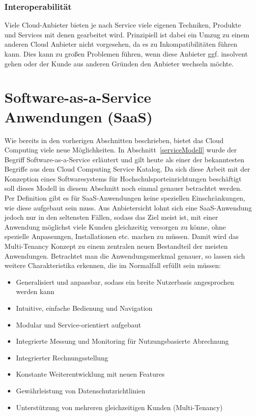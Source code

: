 \subsubsection{Interoperabilität}
Viele Cloud-Anbieter bieten je nach Service viele eigenen Techniken, Produkte und Services mit denen gearbeitet wird. Prinzipiell ist dabei ein Umzug zu einem anderen Cloud Anbieter nicht vorgesehen, da es zu Inkompatibilitäten führen kann. Dies kann zu großen Problemen führen, wenn diese Anbieter ggf. insolvent gehen oder der Kunde aus anderen Gründen den Anbieter wechseln möchte. 

\section{Software-as-a-Service Anwendungen (SaaS)}\label{SaaS}
Wie bereits in den vorherigen Abschnitten beschrieben, bietet das Cloud Computing viele neue Möglichkeiten. In Abschnitt~\ref{serviceModell} wurde der Begriff Software-as-a-Service erläutert und gilt heute als einer der bekanntesten Begriffe aus dem Cloud Computing Service Katalog. Da sich diese Arbeit mit der Konzeption eines Softwaresystems für Hochschulsporteinrichtungen beschäftigt soll dieses Modell in diesem Abschnitt noch einmal genauer betrachtet werden. 
\\
Per Definition gibt es für SaaS-Anwendungen keine speziellen Einschränkungen, wie diese aufgebaut sein muss. Aus Anbietersicht lohnt sich eine SaaS-Anwendung jedoch nur in den seltensten Fällen, sodass das Ziel meist ist, mit einer Anwendung möglichst viele Kunden gleichzeitig versorgen zu könne, ohne spezielle Anpassungen, Installationen etc. machen zu müssen. Damit wird das Multi-Tenancy Konzept zu einem zentralen neuen Bestandteil der meisten Anwendungen. Betrachtet man die Anwendungsmerkmal genauer, so lassen sich weitere Charakteristika erkennen, die im Normalfall erfüllt sein müssen:

\begin{itemize}
	\item Generalisiert und anpassbar, sodass ein breite Nutzerbasis angesprochen werden kann
	\item Intuitive, einfache Bedienung und Navigation
	\item Modular und Service-orientiert aufgebaut
	\item Integrierte Messung und Monitoring für Nutzungsbasierte Abrechnung
	\item Integrierter Rechnungsstellung
	\item Konstante Weiterentwicklung mit neuen Features
	\item Gewährleistung von Datenschutzrichtlinien
	\item Unterstützung von mehreren gleichzeitigen Kunden (Multi-Tenancy)
\end{itemize}


